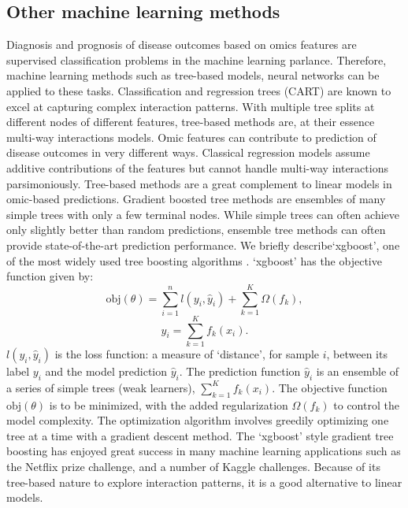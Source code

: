\subsection{Other machine learning methods}
\label{sec:tree}
Diagnosis and prognosis of disease outcomes based on omics features are supervised classification problems in the machine learning parlance. Therefore, machine learning methods such as tree-based models, neural networks can be applied to these tasks. Classification and regression trees (CART) are known to excel at capturing complex interaction patterns. With multiple tree splits at different nodes of different features, tree-based methods are, at their essence multi-way interactions models. Omic features can contribute to prediction of disease outcomes in very different ways. Classical regression models assume additive contributions of the features but cannot handle multi-way interactions parsimoniously. Tree-based methods are a great complement to linear models in omic-based predictions. Gradient boosted tree methods are ensembles of many simple trees with only a few terminal nodes. While simple trees can often achieve only slightly better than random predictions, ensemble tree methods can often provide state-of-the-art prediction performance. We briefly describe`xgboost', one of the most widely used tree boosting algorithms \citep{chen2016xgboost}. `xgboost' has the objective function given by:
\begin{displaymath}
\text{obj}(\theta) = \sum_{i=1}^n l(y_i, \hat{y}_i) + \sum_{k=1}^K \Omega(f_k), 
\end{displaymath}
\begin{displaymath}
\hat{y}_i = \sum_{k=1}^Kf_k(x_i).
\end{displaymath}
$l(y_i, \hat{y}_i)$ is the loss function: a measure of `distance', for sample $i$, between its label $y_i$ and the model prediction $\hat{y}_i$. The prediction function $\hat{y}_i$ is an ensemble of a series of simple trees (weak learners), $\sum_{k=1}^Kf_k(x_i)$. The objective function $\text{obj}(\theta)$ is to be minimized, with the added regularization $\Omega(f_k)$ to control the model complexity. The optimization algorithm involves greedily optimizing one tree at a time with a gradient descent method. The `xgboost' style gradient tree boosting has enjoyed great success in many machine learning applications such as the Netflix prize challenge, and a number of Kaggle challenges. Because of its tree-based nature to explore interaction patterns, it is a good alternative to linear models.

